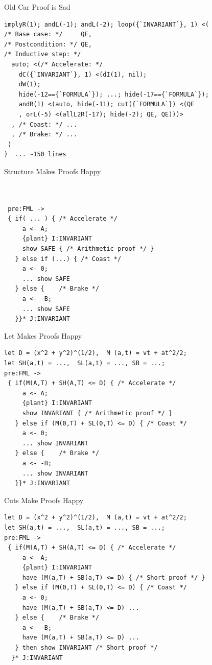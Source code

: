 \documentclass[slidestop,aspectratio=169]{beamer}
\theoremstyle{plain}
\theoremstyle{definition}
\theoremstyle{remark}
\begin{document}
\begin{frame}[t,fragile]{Old Car Proof is Sad}
\begin{verbatim}
implyR(1); andL(-1); andL(-2); loop({`INVARIANT`}, 1) <(
/* Base case: */     QE,
/* Postcondition: */ QE,
/* Inductive step: */
  auto; <(/* Accelerate: */
    dC({`INVARIANT`}, 1) <(dI(1), nil);
    dW(1);
    hide(-12=={`FORMULA`}); ...; hide(-17=={`FORMULA`});
    andR(1) <(auto, hide(-11); cut({`FORMULA`}) <(QE
    , orL(-5) <(allL2R(-17); hide(-2); QE, QE)))>
  , /* Coast: */ ...
  , /* Brake: */ ...
 )
)  ... ~150 lines
\end{verbatim}
\end{frame}

\begin{frame}[t,fragile]{Structure Makes Proofs Happy}
\begin{verbatim}


 pre:FML ->
 { if( ... ) { /* Accelerate */
     a <- A;
     {plant} I:INVARIANT
     show SAFE { /* Arithmetic proof */ }
   } else if (...) { /* Coast */
     a <- 0;
     ... show SAFE
   } else {    /* Brake */
     a <- -B;
     ... show SAFE
   }}* J:INVARIANT
\end{verbatim}
\end{frame}

\begin{frame}[t,fragile]{Let Makes Proofs Happy}
\begin{verbatim}
let D = (x^2 + y^2)^(1/2),  M (a,t) = vt + at^2/2;
let SH(a,t) = ...,  SL(a,t) = ..., SB = ...;
pre:FML ->
 { if(M(A,T) + SH(A,T) <= D) { /* Accelerate */
     a <- A;
     {plant} I:INVARIANT
     show INVARIANT { /* Arithmetic proof */ }
   } else if (M(0,T) + SL(0,T) <= D) { /* Coast */
     a <- 0;
     ... show INVARIANT
   } else {    /* Brake */
     a <- -B;
     ... show INVARIANT
   }}* J:INVARIANT

\end{verbatim}
\end{frame}

\begin{frame}[t,fragile]{Cuts Make Proofs Happy}
\begin{verbatim}
let D = (x^2 + y^2)^(1/2),  M (a,t) = vt + at^2/2;
let SH(a,t) = ...,  SL(a,t) = ..., SB = ...;
pre:FML ->
 { if(M(A,T) + SH(A,T) <= D) { /* Accelerate */
     a <- A;
     {plant} I:INVARIANT
     have (M(a,T) + SB(a,T) <= D) { /* Short proof */ }
   } else if (M(0,T) + SL(0,T) <= D) { /* Coast */
     a <- 0;
     have (M(a,T) + SB(a,T) <= D) ...
   } else {    /* Brake */
     a <- -B;
     have (M(a,T) + SB(a,T) <= D) ...
   } then show INVARIANT /* Short proof */
  }* J:INVARIANT

\end{verbatim}
\end{frame}
\end{document}
